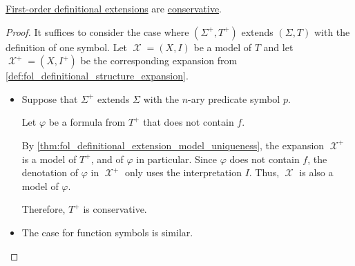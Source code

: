 \begin{proposition}\label{thm:fol_definitional_extension_conservative}
  \hyperref[def:fol_definitional_extension]{First-order definitional extensions} are \hyperref[def:fol_theory/conservative]{conservative}.
\end{proposition}
\begin{proof}
  It suffices to consider the case where \( (\Sigma^+, T^+) \) extends \( (\Sigma, T) \) with the definition of one symbol. Let \( \mscrX = (X, I) \) be a model of \( T \) and let \( \mscrX^+ = (X, I^+) \) be the corresponding expansion from \cref{def:fol_definitional_structure_expansion}.
  \begin{itemize}
    \item Suppose that \( \Sigma^+ \) extends \( \Sigma \) with the \( n \)-ary predicate symbol \( p \).

    Let \( \varphi \) be a formula from \( T^+ \) that does not contain \( f \).

    By \cref{thm:fol_definitional_extension_model_uniqueness}, the expansion \( \mscrX^+ \) is a model of \( T^+ \), and of \( \varphi \) in particular. Since \( \varphi \) does not contain \( f \), the denotation of \( \varphi \) in \( \mscrX^+ \) only uses the interpretation \( I \). Thus, \( \mscrX \) is also a model of \( \varphi \).

    Therefore, \( T^+ \) is conservative.

    \item The case for function symbols is similar.
  \end{itemize}
\end{proof}

